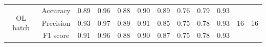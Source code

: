 \documentclass[12pt]{report}
\begin{document}
\begin{table}[]
\begin{tabular}{cc|cccccccccc}
\multirow{3}{*}{OL batch}                       & Accuracy                   & 0.89                   & 0.96                   & 0.88                   & 0.90                   & 0.89                   & 0.76                   & 0.79                   & 0.93                   & \multirow{3}{*}{16}                                                                        & \multirow{3}{*}{16}                                                      \\ \cline{2-2}
                                                & Precision                  & 0.93                   & 0.97                   & 0.89                   & 0.91                   & 0.85                   & 0.75                   & 0.78                   & 0.93                   &                                                                                            &                                                                          \\ \cline{2-2}
                                                & F1 score                   & 0.91                   & 0.96                   & 0.88                   & 0.90                   & 0.87                   & 0.75                   & 0.78                   & 0.93                   &                                                                                            &                                                                          \\ \cline{1-2}
\end{tabular}
\end{table}
\end{document}
